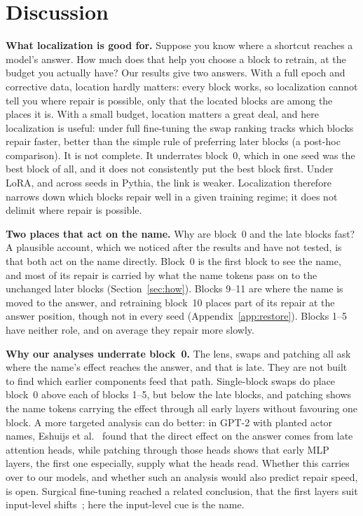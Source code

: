 \section{Discussion}
\label{sec:discussion}

\textbf{What localization is good for.} Suppose you know where a shortcut reaches a model's answer. How much does that
help you choose a block to retrain, at the budget you actually have? Our results give two answers. With a full epoch
and corrective data, location hardly matters: every block works, so localization cannot tell you where repair is
possible, only that the located blocks are among the places it is. With a small budget, location matters a great
deal, and here localization is useful: under full fine-tuning the swap ranking tracks which blocks repair faster,
better than the simple rule of preferring later blocks (a post-hoc comparison). It is not complete. It underrates block~0, which in one seed
was the best block of all, and it does not consistently put the best block first. Under LoRA, and across seeds in
Pythia, the link is weaker. Localization therefore narrows down which blocks repair well in a given training regime;
it does not delimit where repair is possible.

\textbf{Two places that act on the name.} Why are block~0 and the late blocks fast? A plausible account, which we
noticed after the results and have not tested, is that both act on the name directly. Block~0 is the first block to
see the name, and most of its repair is carried by what the name tokens pass on to the unchanged later blocks
(Section~\ref{sec:how}). Blocks 9--11 are where the name is moved to the answer, and retraining block~10 places part of
its repair at the answer position, though not in every seed (Appendix~\ref{app:restore}). Blocks 1--5 have neither
role, and on average they repair more slowly.

\textbf{Why our analyses underrate block~0.} The lens, swaps and patching all ask where the name's effect reaches the
answer, and that is late. They are not built to find which earlier components feed that path. Single-block swaps do
place block~0 above each of blocks 1--5, but below the late blocks, and patching shows the name tokens carrying the
effect through all early layers without favouring one block. A more targeted analysis can do better: in GPT-2 with
planted actor names, Eshuijs et al.~\cite{eshuijs2025short} found that the direct effect on the answer comes from late
attention heads, while patching through those heads shows that early MLP layers, the first one especially, supply what
the heads read. Whether this carries over to our models, and whether such an analysis would also predict repair
speed, is open. Surgical fine-tuning reached a related conclusion, that the first layers suit input-level
shifts~\cite{lee2023surgical}; here the input-level cue is the name.

